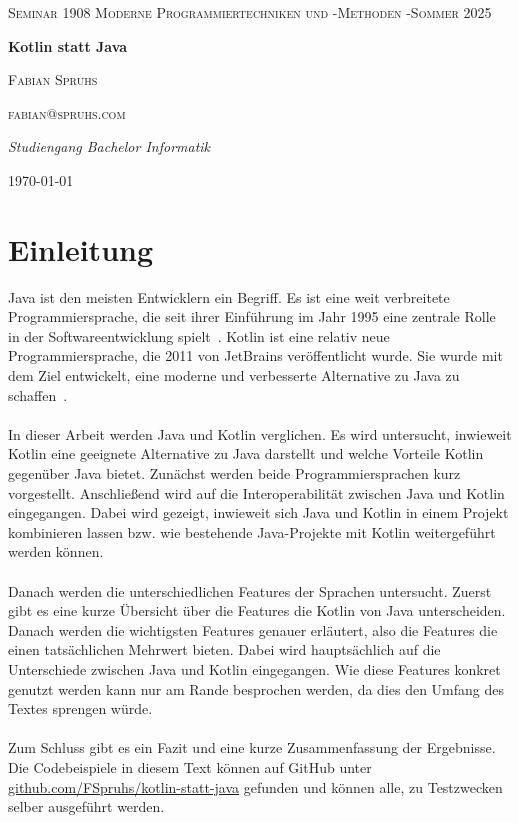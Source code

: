 \documentclass[11pt]{article}
\begin{document}
    \begin{titlepage}
        \centering
        {\scshape\LARGE Seminar 1908 Moderne Programmiertechniken und -Methoden -Sommer 2025 \par}
        \vspace{1cm}
        {\huge\bfseries Kotlin statt Java\par}
        \vspace{1.5cm}
        {\scshape\Large Fabian Spruhs\par}
        {\scshape fabian@spruhs.com\par}
        \vspace{2cm}
        {\Large\itshape Studiengang Bachelor Informatik\par}
        \vspace{2cm}


        {\large \today\par}
    \end{titlepage}

    \tableofcontents
    \newpage

    \section{Einleitung}
    Java ist den meisten Entwicklern ein Begriff.
    Es ist eine weit verbreitete Programmiersprache, die seit ihrer Einführung im Jahr 1995 eine zentrale Rolle in der Softwareentwicklung spielt~\cite[54]{insel}.
    Kotlin ist eine relativ neue Programmiersprache, die 2011 von JetBrains veröffentlicht wurde.
    Sie wurde mit dem Ziel entwickelt, eine moderne und verbesserte Alternative zu Java zu schaffen~\cite[19]{kotlin-handbuch}.\\
    \\
    In dieser Arbeit werden Java und Kotlin verglichen.
    Es wird untersucht, inwieweit Kotlin eine geeignete Alternative zu Java darstellt und welche Vorteile Kotlin gegenüber Java bietet.
    Zunächst werden beide Programmiersprachen kurz vorgestellt.
    Anschließend wird auf die Interoperabilität zwischen Java und Kotlin eingegangen.
    Dabei wird gezeigt, inwieweit sich Java und Kotlin in einem Projekt kombinieren lassen bzw. wie bestehende Java-Projekte mit Kotlin weitergeführt werden können.\\
    \\
    Danach werden die unterschiedlichen Features der Sprachen untersucht.
    Zuerst gibt es eine kurze Übersicht über die Features die Kotlin von Java unterscheiden.
    Danach werden die wichtigsten Features genauer erläutert, also die Features die einen tatsächlichen Mehrwert bieten.
    Dabei wird hauptsächlich auf die Unterschiede zwischen Java und Kotlin eingegangen.
    Wie diese Features konkret genutzt werden kann nur am Rande besprochen werden, da dies den Umfang des Textes sprengen würde.\\
    \\
    Zum Schluss gibt es ein Fazit und eine kurze Zusammenfassung der Ergebnisse.
    Die Codebeispiele in diesem Text können auf GitHub unter \url{github.com/FSpruhs/kotlin-statt-java} gefunden und können alle, zu Testzwecken selber ausgeführt werden.\\
    \\
\end{document}
